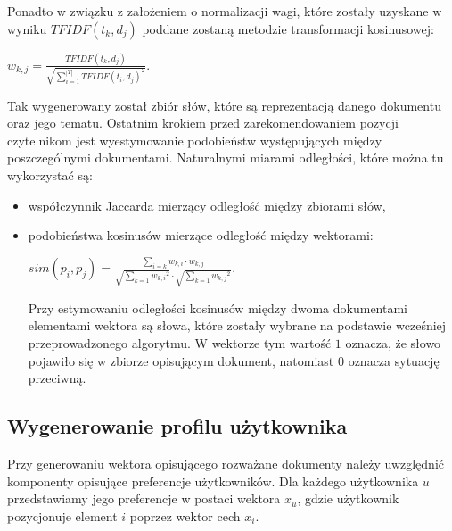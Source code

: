 \documentclass[12pt,a4paper]{report}
\begin{document}
Ponadto w związku z założeniem o normalizacji wagi, które zostały uzyskane w wyniku \begin{math}
TFIDF(t_k, d_j)
\end{math} poddane zostaną metodzie transformacji kosinusowej: 
\begin{center}
\begin{math}
w_{k,j} = \frac{TFIDF(t_k, d_j)}{\sqrt{\sum_{i=1}^{|T|}{TFIDF(t_i, d_j)}^2}}.
\end{math}
\end{center}
Tak wygenerowany został zbiór słów, które są reprezentacją danego dokumentu oraz jego tematu. Ostatnim krokiem przed zarekomendowaniem pozycji czytelnikom jest wyestymowanie podobieństw występujących między poszczególnymi dokumentami. Naturalnymi miarami odległości, które można tu wykorzystać są:
\begin{itemize}
\item współczynnik Jaccarda mierzący odległość między zbiorami słów,
\item podobieństwa kosinusów mierzące odległość między wektorami:

\begin{center}
\begin{math}
sim(p_i,p_j) = \frac{\sum_{i=k} w_{k,i}\cdot w_{k,j}}{\sqrt{\sum_{k=1}{w_{k,i}}^2} \cdot \sqrt{\sum_{k=1}{w_{k,j}}^2}}.
\end{math}
\end{center}
Przy estymowaniu odległości kosinusów między dwoma dokumentami elementami wektora są słowa, które zostały wybrane na podstawie wcześniej przeprowadzonego algorytmu. W wektorze tym wartość $1$ oznacza, że słowo pojawiło się w zbiorze opisującym dokument, natomiast $0$ oznacza sytuację przeciwną.
\end{itemize}

\subsection{Wygenerowanie profilu użytkownika}
Przy generowaniu wektora opisującego rozważane dokumenty należy uwzględnić komponenty opisujące preferencje użytkowników. Dla każdego użytkownika $u$ przedstawiamy jego preferencje w postaci wektora $x_u$, gdzie użytkownik pozycjonuje element $i$ poprzez wektor cech $x_i$.
\end{document}

